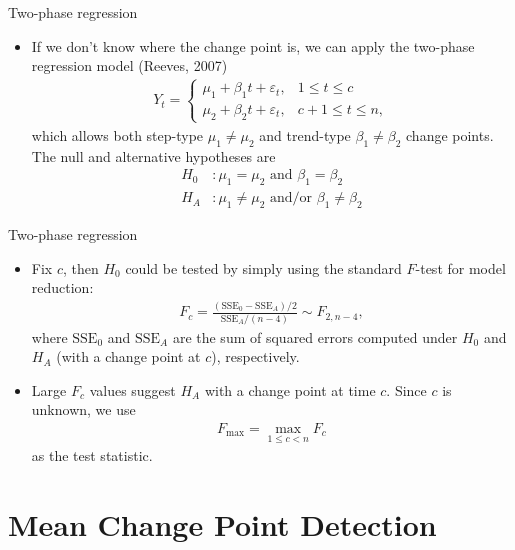 \documentclass{beamer}
\begin{document}
\begin{frame}{Two-phase regression}
    \begin{itemize}
        \item If we don't know where the change point is, we can apply the two-phase regression model (Reeves, 2007)
        \begin{align*}
            Y_t =
            \begin{cases}
                \mu_1 + \beta_1 t + \varepsilon_t, & 1 \leq t \leq c \\
                \mu_2 + \beta_2 t + \varepsilon_t, & c+1 \leq t \leq n,
            \end{cases}
        \end{align*}
        which allows both step-type $\mu_1 \neq \mu_2$ and trend-type $\beta_1 \neq \beta_2$ change points. The null and alternative hypotheses are
        \begin{align*}
            H_0&: \mu_1 = \mu_2 \text{ and } \beta_1 = \beta_2 \\
            H_A&: \mu_1 \neq \mu_2 \text{ and/or } \beta_1 \neq \beta_2
        \end{align*}
    \end{itemize}
\end{frame}

\begin{frame}{Two-phase regression}
    \begin{itemize}
        \item Fix $c$, then $H_0$ could be tested by simply using the standard $F$-test for model reduction:
        \begin{align*}
            F_c = \frac{(\text{SSE}_0-\text{SSE}_A)/2}{\text{SSE}_A/(n-4)} \sim F_{2,n-4},
        \end{align*}
        where $\text{SSE}_0$ and $\text{SSE}_A$ are the sum of squared errors computed under $H_0$ and $H_A$ (with a change point at $c$), respectively.
        \bigskip
        
        \item Large $F_c$ values suggest $H_A$ with a change point at time $c$. Since $c$ is unknown, we use
        \begin{align*}
            F_{\text{max}} = \max_{1\leq c<n} F_c
        \end{align*}
        as the test statistic. 
    \end{itemize}
\end{frame}

\section[Mean CPD]{Mean Change Point Detection}
\end{document}
